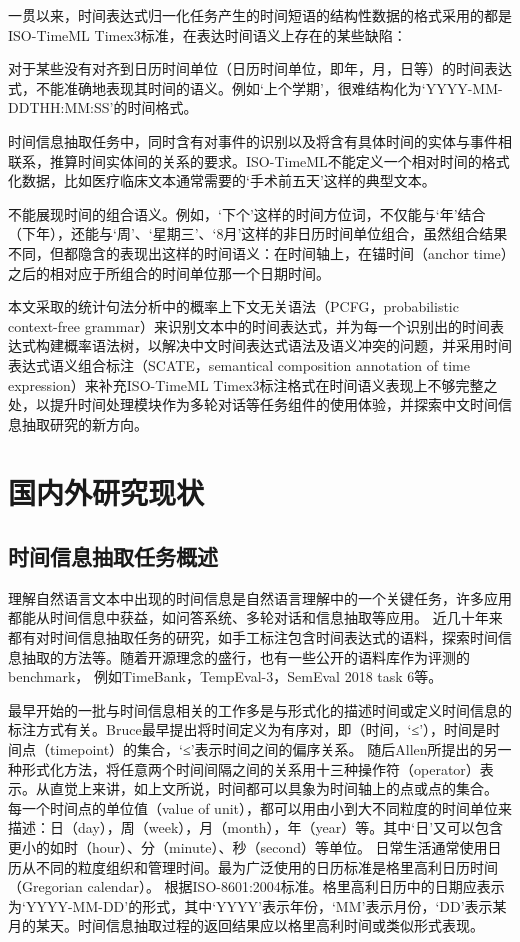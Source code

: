 一贯以来，时间表达式归一化任务产生的时间短语的结构性数据的格式采用的都是ISO-TimeML Timex3标准，在表达时间语义上存在的某些缺陷：

对于某些没有对齐到日历时间单位（日历时间单位，即年，月，日等）的时间表达式，不能准确地表现其时间的语义。例如‘上个学期’，很难结构化为‘YYYY-MM-DDTHH:MM:SS’的时间格式。

时间信息抽取任务中，同时含有对事件的识别以及将含有具体时间的实体与事件相联系，推算时间实体间的关系的要求。ISO-TimeML不能定义一个相对时间的格式化数据，比如医疗临床文本通常需要的‘手术前五天’这样的典型文本。

不能展现时间的组合语义。例如，‘下个’这样的时间方位词，不仅能与‘年’结合（下年），还能与‘周’、‘星期三’、‘8月’这样的非日历时间单位组合，虽然组合结果不同，但都隐含的表现出这样的时间语义：在时间轴上，在锚时间（anchor time）之后的相对应于所组合的时间单位那一个日期时间。

本文采取的统计句法分析中的概率上下文无关语法（PCFG，probabilistic context-free grammar）来识别文本中的时间表达式，并为每一个识别出的时间表达式构建概率语法树，以解决中文时间表达式语法及语义冲突的问题，并采用时间表达式语义组合标注\cite{bethard-parker-2016-semantically}（SCATE，semantical composition annotation of time expression）来补充ISO-TimeML Timex3标注格式在时间语义表现上不够完整之处，以提升时间处理模块作为多轮对话等任务组件的使用体验，并探索中文时间信息抽取研究的新方向。

\section{国内外研究现状}

\subsection{时间信息抽取任务概述}

理解自然语言文本中出现的时间信息是自然语言理解中的一个关键任务，许多应用都能从时间信息中获益，如问答系统、多轮对话和信息抽取等应用。
近几十年来都有对时间信息抽取任务的研究，如手工标注包含时间表达式的语料，探索时间信息抽取的方法等。随着开源理念的盛行，也有一些公开的语料库作为评测的benchmark，
例如TimeBank\cite{Pustejovsky03}，TempEval-3\cite{uzzaman-etal-2013-semeval}，SemEval 2018 task 6\cite{laparra-etal-2018-semeval}等。

最早开始的一批与时间信息相关的工作多是与形式化的描述时间或定义时间信息的标注方式有关。Bruce\cite{bruce1972model}最早提出将时间定义为有序对，即（时间，‘≤’），时间是时间点（timepoint）的集合，‘≤’表示时间之间的偏序关系。
随后Allen\cite{allen1983maintaining}所提出的另一种形式化方法，将任意两个时间间隔之间的关系用十三种操作符（operator）表示。从直觉上来讲，如上文所说，时间都可以具象为时间轴上的点或点的集合。
每一个时间点的单位值（value of unit），都可以用由小到大不同粒度的时间单位来描述：日（day），周（week），月（month），年（year）等。其中‘日’又可以包含更小的如时（hour）、分（minute）、秒（second）等单位。
日常生活通常使用日历从不同的粒度组织和管理时间。最为广泛使用的日历标准是格里高利日历时间（Gregorian calendar）。
根据ISO-8601:2004标准。格里高利日历中的日期应表示为‘YYYY-MM-DD’的形式，其中‘YYYY’表示年份，‘MM’表示月份，‘DD’表示某月的某天。时间信息抽取过程的返回结果应以格里高利时间或类似形式表现。

